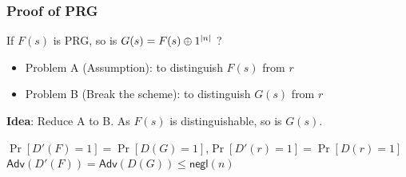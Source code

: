 \begin{frame}\frametitle{Proof of PRG}
\begin{exampleblock}{If $F(s)$ is PRG, so is $G(s)=F(s)\oplus 1^{\lvert n\rvert}$ ?}
\begin{itemize}
\item Problem A (Assumption): to distinguish $F(s)$ from $r$
\item Problem B (Break the scheme): to distinguish $G(s)$ from $r$
\end{itemize}
\textbf{Idea}: Reduce A to B. As $F(s)$ is distinguishable, so is $G(s)$.
\begin{figure}
\begin{center}

\end{center}
\end{figure}
$\Pr[D'(F)=1]=\Pr[D(G)=1]$,$\Pr[D'(r)=1]=\Pr[D(r)=1]$ \\
$\mathsf{Adv}(D'(F)) = \mathsf{Adv}(D(G)) \le \mathsf{negl}(n) $
\end{exampleblock}
\end{frame}
